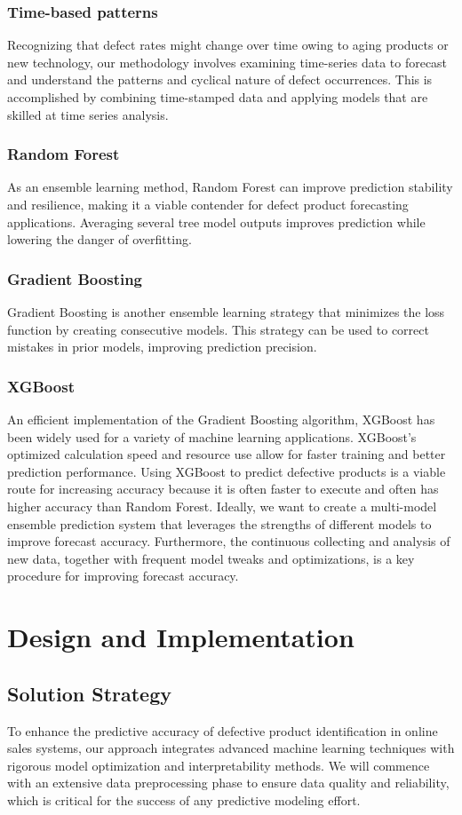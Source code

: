 \documentclass[conference]{IEEEtran}
\begin{document}
\subsubsection{Time-based patterns}
Recognizing that defect rates might change over time owing to aging products or new technology, our methodology involves examining time-series data to forecast and understand the patterns and cyclical nature of defect occurrences. This is accomplished by combining time-stamped data and applying models that are skilled at time series analysis.
\subsubsection{Random Forest}
 As an ensemble learning method, Random Forest can improve prediction stability and resilience, making it a viable contender for defect product forecasting applications. Averaging several tree model outputs improves prediction while lowering the danger of overfitting.
\subsubsection{Gradient Boosting}
Gradient Boosting is another ensemble learning strategy that minimizes the loss function by creating consecutive models. This strategy can be used to correct mistakes in prior models, improving prediction precision.
\subsubsection{XGBoost}
 An efficient implementation of the Gradient Boosting algorithm, XGBoost has been widely used for a variety of machine learning applications. XGBoost's optimized calculation speed and resource use allow for faster training and better prediction performance. Using XGBoost to predict defective products is a viable route for increasing accuracy because it is often faster to execute and often has higher accuracy than Random Forest.
Ideally, we want to create a multi-model ensemble prediction system that leverages the strengths of different models to improve forecast accuracy. Furthermore, the continuous collecting and analysis of new data, together with frequent model tweaks and optimizations, is a key procedure for improving forecast accuracy.

\section{Design and Implementation}
\subsection{Solution Strategy}
To enhance the predictive accuracy of defective product identification in online sales systems, our approach integrates advanced machine learning techniques with rigorous model optimization and interpretability methods. We will commence with an extensive data preprocessing phase to ensure data quality and reliability, which is critical for the success of any predictive modeling effort.
\end{document}
